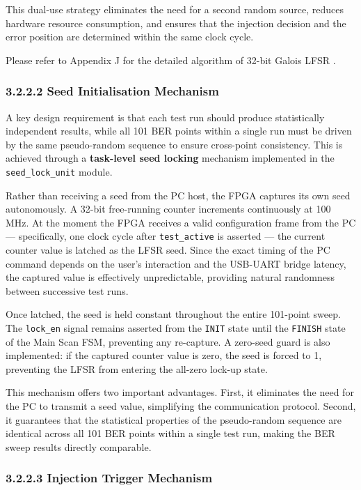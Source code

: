 \documentclass[
  english,
  12pt,
]{report}
\begin{document}
This dual-use strategy eliminates the need for a second random source,
reduces hardware resource consumption, and ensures that the injection
decision and the error position are determined within the same clock
cycle.

Please refer to Appendix J for the detailed algorithm of 32-bit Galois
LFSR .

\subsubsection{3.2.2.2 Seed Initialisation
Mechanism}\label{seed-initialisation-mechanism}

A key design requirement is that each test run should produce
statistically independent results, while all 101 BER points within a
single run must be driven by the same pseudo-random sequence to ensure
cross-point consistency. This is achieved through a \textbf{task-level
seed locking} mechanism implemented in the \texttt{seed\_lock\_unit}
module.

Rather than receiving a seed from the PC host, the FPGA captures its own
seed autonomously. A 32-bit free-running counter increments continuously
at 100 MHz. At the moment the FPGA receives a valid configuration frame
from the PC --- specifically, one clock cycle after
\texttt{test\_active} is asserted --- the current counter value is
latched as the LFSR seed. Since the exact timing of the PC command
depends on the user's interaction and the USB-UART bridge latency, the
captured value is effectively unpredictable, providing natural
randomness between successive test runs.

Once latched, the seed is held constant throughout the entire 101-point
sweep. The \texttt{lock\_en} signal remains asserted from the
\texttt{INIT} state until the \texttt{FINISH} state of the Main Scan
FSM, preventing any re-capture. A zero-seed guard is also implemented:
if the captured counter value is zero, the seed is forced to 1,
preventing the LFSR from entering the all-zero lock-up state.

This mechanism offers two important advantages. First, it eliminates the
need for the PC to transmit a seed value, simplifying the communication
protocol. Second, it guarantees that the statistical properties of the
pseudo-random sequence are identical across all 101 BER points within a
single test run, making the BER sweep results directly comparable.

\subsubsection{3.2.2.3 Injection Trigger
Mechanism}\label{injection-trigger-mechanism}
\end{document}
